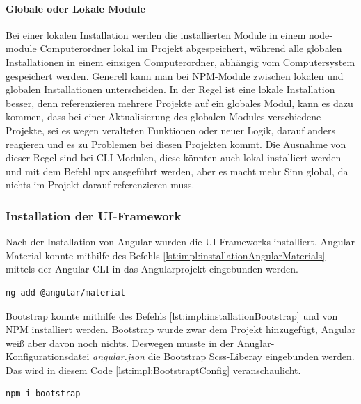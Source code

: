 \paragraph{Globale oder Lokale Module}
Bei einer lokalen Installation werden die installierten Module in einem node-module Computerordner lokal im Projekt abgespeichert, während alle globalen Installationen in einem einzigen Computerordner, abhängig vom Computersystem gespeichert werden.
Generell kann man bei NPM-Module zwischen lokalen und globalen Installationen unterscheiden. In der Regel ist eine lokale Installation besser, denn referenzieren mehrere Projekte auf ein globales Modul, kann es dazu kommen, dass bei einer Aktualisierung des globalen Modules verschiedene Projekte, sei es wegen veralteten Funktionen oder neuer Logik, darauf anders reagieren und es zu Problemen bei diesen Projekten kommt.
Die Ausnahme von dieser Regel sind bei CLI-Modulen, diese könnten auch lokal installiert werden und mit dem Befehl npx ausgeführt werden, aber es macht mehr Sinn global, da nichts im Projekt darauf referenzieren muss.
\cite{npmlocalorglobal}

\subsubsection{Installation der UI-Framework}

Nach der Installation von Angular wurden die UI-Frameworks installiert. Angular Material konnte mithilfe des Befehls  \ref{lst:impl:installationAngularMaterials} mittels der Angular CLI in das Angularprojekt eingebunden werden.

\begin{lstlisting}[caption={{Terminal - Angular Material Installation}},language=bash,label=lst:impl:installationAngularMaterials]
    ng add @angular/material
\end{lstlisting}

Bootstrap konnte mithilfe des Befehls \ref{lst:impl:installationBootstrap} und von NPM installiert werden. Bootstrap wurde zwar dem Projekt hinzugefügt, Angular weiß aber davon noch nichts. Deswegen musste in der Anuglar-Konfigurationsdatei \emph{angular.json} die Bootstrap Scss-Liberay eingebunden werden. Das wird in diesem Code \ref{lst:impl:BootstraptConfig} veranschaulicht. 

\begin{lstlisting}[caption={{Terminal - Bootstrap Installation}},language=bash,label=lst:impl:installationBootstrap]
    npm i bootstrap
\end{lstlisting}

